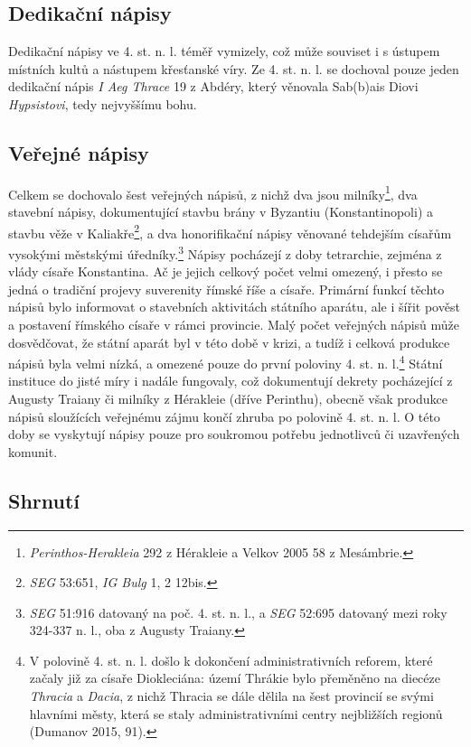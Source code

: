 \subsection[dedikační-nápisy-17]{Dedikační nápisy}

Dedikační nápisy ve 4. st. n. l. téměř vymizely, což může souviset i s ústupem místních kultů a nástupem křesťanské víry. Ze 4. st. n. l. se dochoval pouze jeden dedikační nápis {\em I Aeg Thrace} 19 z Abdéry, který věnovala Sab(b)ais Diovi {\em Hypsistovi}, tedy nejvyššímu bohu.

\subsection[veřejné-nápisy-17]{Veřejné nápisy}

Celkem se dochovalo šest veřejných nápisů, z nichž dva jsou milníky\footnote{{\em Perinthos-Herakleia} 292 z Hérakleie a Velkov 2005 58 z Mesámbrie.}, dva stavební nápisy, dokumentující stavbu brány v Byzantiu (Konstantinopoli) a stavbu věže v Kaliakře\footnote{{\em SEG} 53:651, {\em IG Bulg} 1, 2 12bis.}, a dva honorifikační nápisy věnované tehdejším císařům vysokými městskými úředníky.\footnote{{\em SEG} 51:916 datovaný na poč. 4. st. n. l., a {\em SEG} 52:695 datovaný mezi roky 324-337 n. l., oba z Augusty Traiany.} Nápisy pocházejí z doby tetrarchie, zejména z vlády císaře Konstantina. Ač je jejich celkový počet velmi omezený, i přesto se jedná o tradiční projevy suverenity římské říše a císaře. Primární funkcí těchto nápisů bylo informovat o stavebních aktivitách státního aparátu, ale i šířit pověst a postavení římského císaře v rámci provincie. Malý počet veřejných nápisů může dosvědčovat, že státní aparát byl v této době v krizi, a tudíž i celková produkce nápisů byla velmi nízká, a omezené pouze do první poloviny 4. st. n. l.\footnote{V polovině 4. st. n. l. došlo k dokončení administrativních reforem, které začaly již za císaře Diokleciána: území Thrákie bylo přeměněno na diecéze {\em Thracia} a {\em Dacia}, z nichž Thracia se dále dělila na šest provincií se svými hlavními městy, která se staly administrativními centry nejbližších regionů (Dumanov 2015, 91).} Státní instituce do jisté míry i nadále fungovaly, což dokumentují dekrety pocházející z Augusty Traiany či milníky z Hérakleie (dříve Perinthu), obecně však produkce nápisů sloužících veřejnému zájmu končí zhruba po polovině 4. st. n. l. O této doby se vyskytují nápisy pouze pro soukromou potřebu jednotlivců či uzavřených komunit.

\subsection[shrnutí-21]{Shrnutí}


